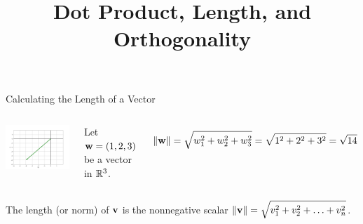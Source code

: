 \documentclass[xcolor=dvipsnames,aspectratio=169,t]{beamer}
\title{Dot Product, Length, and Orthogonality}
\begin{document}
\maketitle

\begin{frame}{Calculating the Length of a Vector}
  \begin{columns}[T]
  \column{0.5\tw}
  \includegraphics[width=0.6\tw]{images/fig-dist1.png}
  

  \column{0.5\tw}
  \pause
  
  \vspace*{4em}
  
  Let $\mathbf{w}=(1,2,3)$ be a vector in $\mathbb{R}^3$.
  
  {\small \[ \| \mathbf{w} \| = \sqrt{w_1^2+w_2^2+w_3^2} =   \sqrt{1^2+2^2+3^2} = \sqrt{14} \]}
  \end{columns}
  \medskip
  
  \pause
  \bbox
  The \alert{length} (or \alert{norm}) of $\mathbf{v}$ is the nonnegative scalar \alert{$\displaystyle \| \mathbf{v} \| = \sqrt{v_1^2 + v_2^2 + \ldots + v_n^2}$}.
  \ebox
\end{frame}
\end{document}

